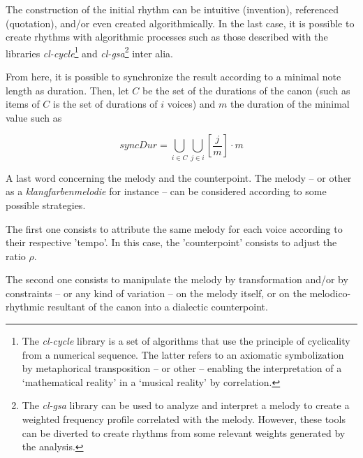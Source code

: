 \newpage

 The construction of the initial rhythm can be intuitive (invention), referenced (quotation), and/or even created algorithmically. In the last case, it is possible to create rhythms with algorithmic processes such as those described with the libraries \textsl{cl-cycle}\footnote{The \textsl{cl-cycle} library is a set of algorithms that use the principle of cyclicality from a numerical sequence. The latter refers to an axiomatic symbolization by metaphorical transposition -- or other -- enabling the interpretation of a `mathematical reality' in a `musical reality' by correlation.} and \textsl{cl-gsa}\footnote{The \textsl{cl-gsa} library can be used to analyze and interpret a melody to create a weighted frequency profile correlated with the melody. However, these tools can be diverted to create rhythms from some relevant weights generated by the analysis.} inter alia.
 
 \bigskip
 
From here, it is possible to synchronize the result according to a minimal note length as duration. Then, let $C$ be the set of the durations of the canon (such as items of $C$ is the set of durations of $i$ voices) and $m$ the duration of the minimal value such as

\[
syncDur = \displaystyle \bigcup\limits_{i \in C} \bigcup\limits_{j \in i} \displaystyle \left [ \frac{j}{m} \right ] \cdot m
 \]
 



 

 
 \bigskip
%
 A last word concerning the melody and the counterpoint. The melody -- or other as a \textit{klangfarbenmelodie} for instance -- can be considered according to some possible strategies.

The first one consists to attribute the same melody for each voice according to their respective 'tempo'. In this case, the 'counterpoint' consists to adjust the ratio $\rho$.

The second one consists to manipulate the melody by transformation and/or by constraints -- or any kind of variation -- on the melody itself, or on the melodico-rhythmic resultant of the canon into a dialectic counterpoint. 

\bigskip


